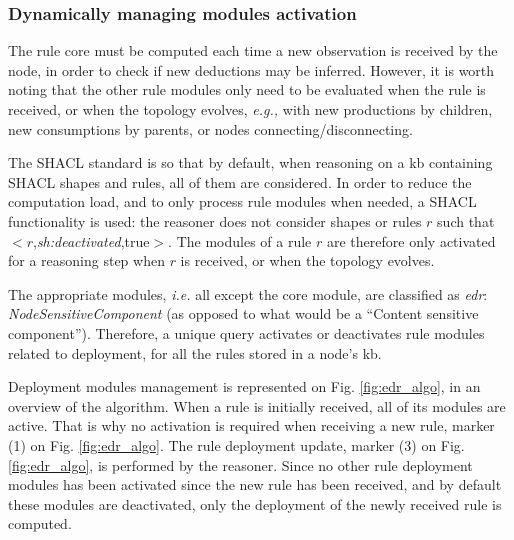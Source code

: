 \documentclass{iosart2c}
\newcommand{\namespace}[1]{\textit{#1$:$}}
\newcommand{\concept}[2]{\namespace{#1}\-\textit{#2}}
\newcommand{\triplet}[3]{$<$#1,\textit{#2},#3$>$}
\begin{document}
%	


\subsubsection{Dynamically managing modules activation}

The rule core must be computed each time a new observation is received by the node, in order to check if new deductions may be inferred.
However, it is worth noting that the other rule modules only need to be evaluated when the rule is received, or when the topology evolves, \textit{e.g.,} with new productions by children, new consumptions by parents, or nodes connecting/disconnecting.

The SHACL standard is so that by default, when reasoning on a \gls{kb} containing SHACL shapes and rules, all of them are considered.
In order to reduce the computation load, and to only process rule modules when needed, a SHACL functionality is used: the reasoner does not consider shapes or rules $r$ such that \triplet{$r$}{sh:deactivated}{true}.
The modules of a rule $r$ are therefore only activated for a reasoning step when $r$ is received, or when the topology evolves.

The appropriate modules, \textit{i.e.} all except the core module, are classified as \concept{edr}{Node\-Sensitive\-Component} (as opposed to what would be a ``Content sensitive component'').
Therefore, a unique query activates or deactivates rule modules related to deployment, for all the rules stored in a node's \gls{kb}.

Deployment modules management is represented on Fig. \ref{fig:edr_algo}, in an overview of the algorithm.
When a rule is initially received, all of its modules are active. 
That is why no activation is required when receiving a new rule, marker (1) on Fig. \ref{fig:edr_algo}. 
The rule deployment update, marker (3) on Fig. \ref{fig:edr_algo}, is performed by the reasoner.
Since no other rule deployment modules has been activated since the new rule has been received, and by default these modules are deactivated, only the deployment of the newly received rule is computed.
\end{document}
